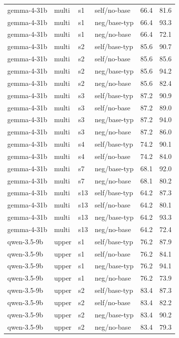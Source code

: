 {\begin{longtable}{llll rr}
gemma-4-31b & multi & s1 & self/no-base & 66.4 & 81.6 \\
gemma-4-31b & multi & s1 & neg/base-typ & 66.4 & 93.3 \\
gemma-4-31b & multi & s1 & neg/no-base & 66.4 & 72.1 \\
gemma-4-31b & multi & s2 & self/base-typ & 85.6 & 90.7 \\
gemma-4-31b & multi & s2 & self/no-base & 85.6 & 85.6 \\
gemma-4-31b & multi & s2 & neg/base-typ & 85.6 & 94.2 \\
gemma-4-31b & multi & s2 & neg/no-base & 85.6 & 82.4 \\
gemma-4-31b & multi & s3 & self/base-typ & 87.2 & 90.9 \\
gemma-4-31b & multi & s3 & self/no-base & 87.2 & 89.0 \\
gemma-4-31b & multi & s3 & neg/base-typ & 87.2 & 94.0 \\
gemma-4-31b & multi & s3 & neg/no-base & 87.2 & 86.0 \\
gemma-4-31b & multi & s4 & self/base-typ & 74.2 & 90.1 \\
gemma-4-31b & multi & s4 & self/no-base & 74.2 & 84.0 \\
gemma-4-31b & multi & s7 & neg/base-typ & 68.1 & 92.0 \\
gemma-4-31b & multi & s7 & neg/no-base & 68.1 & 80.2 \\
gemma-4-31b & multi & s13 & self/base-typ & 64.2 & 87.3 \\
gemma-4-31b & multi & s13 & self/no-base & 64.2 & 80.1 \\
gemma-4-31b & multi & s13 & neg/base-typ & 64.2 & 93.3 \\
gemma-4-31b & multi & s13 & neg/no-base & 64.2 & 72.4 \\
\midrule
qwen-3.5-9b & upper & s1 & self/base-typ & 76.2 & 87.9 \\
qwen-3.5-9b & upper & s1 & self/no-base & 76.2 & 84.1 \\
qwen-3.5-9b & upper & s1 & neg/base-typ & 76.2 & 94.1 \\
qwen-3.5-9b & upper & s1 & neg/no-base & 76.2 & 73.9 \\
qwen-3.5-9b & upper & s2 & self/base-typ & 83.4 & 87.3 \\
qwen-3.5-9b & upper & s2 & self/no-base & 83.4 & 82.2 \\
qwen-3.5-9b & upper & s2 & neg/base-typ & 83.4 & 90.2 \\
qwen-3.5-9b & upper & s2 & neg/no-base & 83.4 & 79.3 \\

\end{longtable}}
